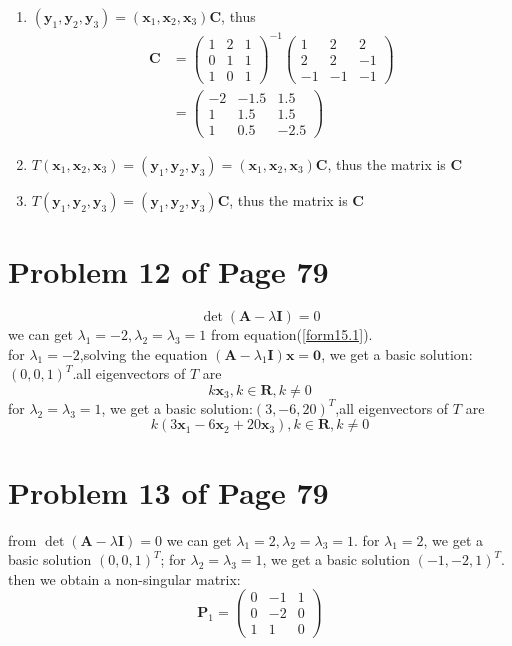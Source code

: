 \documentclass[12pt,a4paper]{article}
\newcommand{\mysection}[2]{
\section{Problem #1 of Page #2}	
	}
\begin{document}
\begin{enumerate}[(1)]
\item  $(\bm{y}_1,\bm{y}_2,\bm{y}_3) = (\bm{x}_1,\bm{x}_2,\bm{x}_3) \bm{C}$,
thus 
\[
\begin{split}
\bm{C} &= \left(\begin{array}{ccc}
1 & 2 & 1\\
0 & 1 & 1 \\
1 & 0 & 1
\end{array} \right)^{-1} \left(\begin{array}{ccc}
1 & 2 &2\\
2 & 2 &-1\\
-1& -1&-1
\end{array} 
\right) \\
&= \left(\begin{array}{ccc} 
-2 & -1.5 & 1.5 \\
1 & 1.5 &1.5 \\
1 &0.5&-2.5
\end{array} 
\right) 
\end{split} 
\]
\item  $T(\bm{x}_1,\bm{x}_2,\bm{x}_3) =(\bm{y}_1,\bm{y}_2,\bm{y}_3)
= (\bm{x}_1,\bm{x}_2,\bm{x}_3) \bm{C}$,
 thus the matrix is $\bm{C}$
\item $T(\bm{y}_1,\bm{y}_2,\bm{y}_3) = (\bm{y}_1,\bm{y}_2,\bm{y}_3) \bm{C}$,
thus the matrix is $\bm{C}$
\end{enumerate} 
\mysection{12}{79}
\begin{equation}
\label{form15.1}
\det (\bm{A} - \lambda \bm{I}) = 0
\end{equation}
we can get $\lambda_1 = -2,\lambda_2 = \lambda_3 = 1$ from equation(\ref{form15.1}).\\
for $\lambda_1 = -2 $,solving the equation $(\bm{A} - \lambda_1 \bm{I})\bm{x} = \bm{0}$,
we get a basic solution:$(0,0,1)^{T} $.all eigenvectors of $T$ are 
\[
k\bm{x}_3, k \in \mathbf{R}, k \neq 0
\]
for $\lambda_2 = \lambda_3 = 1$, we get a basic solution:$(3,-6,20)^{T}$,all eigenvectors of $T$
are 
\[
k(3\bm{x}_1 - 6\bm{x}_2 + 20\bm{x}_3), k \in \mathbf{R}, k \neq 0
\]
\mysection{13}{79}
\qquad from $\det(\bm{A}-\lambda\bm{I}) = 0$  we can get $\lambda_1 = 2,\lambda_2 = \lambda_3 =1$.
for $\lambda_1 = 2$, we get a basic solution $(0,0,1)^{T}$;
for $\lambda_2 = \lambda_3 = 1$, we get a basic solution $(-1,-2,1)^{T}$.
then we obtain a non-singular matrix:
\[
\bm{P}_1 = \left( \begin{array}{ccc}
0 & -1 & 1 \\
0 & -2 & 0\\
1 & 1  & 0
\end{array} 
\right) 
\]
\end{document}
